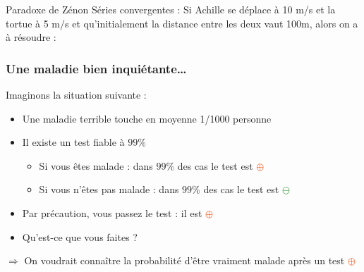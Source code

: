 \documentclass[usenames, dvipsnames]{beamer}
\newcommand{\positif}{\textcolor{OrangeRed}{$\oplus$} }
\newcommand{\negatif}{\textcolor{ForestGreen}{$\ominus$} }
\begin{document}
\begin{frame}[plain]{Paradoxe de Zénon}
{Séries convergentes :}
Si Achille se déplace à 10 m/s et la tortue à 5 m/s et qu'initialement la distance entre les deux vaut 100m, alors on a à résoudre : 
{} %
{}
\end{frame}

\begin{frame}[plain]
\frametitle{Une maladie bien inquiétante\dots}

Imaginons la situation suivante :

\begin{itemize}
\item Une maladie terrible touche en moyenne 1/1000 personne
\item Il existe un test fiable à $99\%$ \pause
\begin{itemize}
\item Si vous êtes malade : dans $99\%$ des cas le test est \positif
\item Si vous n'êtes pas malade : dans $99\%$ des cas le test est \negatif
\end{itemize}
\item Par précaution, vous passez le test : il est \positif \pause
\item Qu'est-ce que vous faites ? \pause
\end{itemize}

$\Rightarrow$ On voudrait connaître la probabilité d'être vraiment malade après un test \positif

\end{frame}
\end{document}
